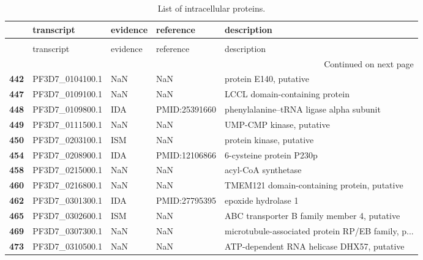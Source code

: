 \begin{longtable}{lllll}
\caption{List of intracellular proteins.}\\
\toprule
{} &       transcript & evidence &      reference &                                        description \\
\midrule
\endfirsthead
\caption[]{List of intracellular proteins.} \\
\toprule
{} &       transcript & evidence &      reference &                                        description \\
\midrule
\endhead
\midrule
\multicolumn{5}{r}{{Continued on next page}} \\
\midrule
\endfoot

\bottomrule
\endlastfoot
\textbf{442} &  PF3D7\_0104100.1 &      NaN &            NaN &                             protein E140, putative \\
\textbf{447} &  PF3D7\_0109100.1 &      NaN &            NaN &                     LCCL domain-containing protein \\
\textbf{448} &  PF3D7\_0109800.1 &      IDA &  PMID:25391660 &           phenylalanine--tRNA ligase alpha subunit \\
\textbf{449} &  PF3D7\_0111500.1 &      NaN &            NaN &                           UMP-CMP kinase, putative \\
\textbf{450} &  PF3D7\_0203100.1 &      ISM &            NaN &                           protein kinase, putative \\
\textbf{454} &  PF3D7\_0208900.1 &      IDA &  PMID:12106866 &                           6-cysteine protein P230p \\
\textbf{458} &  PF3D7\_0215000.1 &      NaN &            NaN &                                acyl-CoA synthetase \\
\textbf{460} &  PF3D7\_0216800.1 &      NaN &            NaN &        TMEM121 domain-containing protein, putative \\
\textbf{462} &  PF3D7\_0301300.1 &      IDA &  PMID:27795395 &                                epoxide hydrolase 1 \\
\textbf{465} &  PF3D7\_0302600.1 &      ISM &            NaN &        ABC transporter B family member 4, putative \\
\textbf{469} &  PF3D7\_0307300.1 &      NaN &            NaN &  microtubule-associated protein RP/EB family, p... \\
\textbf{473} &  PF3D7\_0310500.1 &      NaN &            NaN &         ATP-dependent RNA helicase DHX57, putative \\

\end{longtable}
